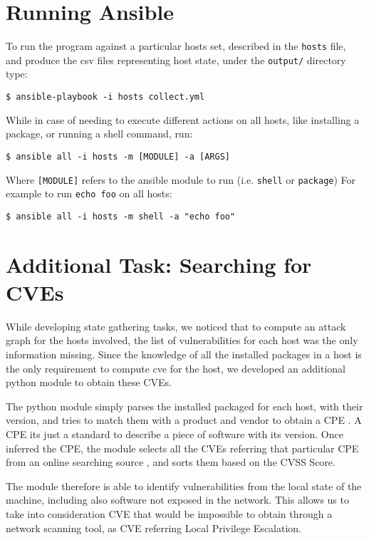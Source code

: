 \documentclass[11pt]{article}
\begin{document}
\section{Running Ansible}

To run the program against a particular hosts set, described in the {\tt hosts} file, and produce the csv files representing host state, under the {\tt output/} directory type:

\begin{verbatim}
$ ansible-playbook -i hosts collect.yml
\end{verbatim}

While in case of needing to execute different actions on all hosts, like installing a package, or running a shell command, run:

\begin{verbatim}
$ ansible all -i hosts -m [MODULE] -a [ARGS]
\end{verbatim}

Where {\tt [MODULE]} refers to the ansible module to run (i.e. {\tt shell} or {\tt package})
For example to run {\tt echo foo} on all hosts: 

\begin{verbatim}
$ ansible all -i hosts -m shell -a "echo foo"
\end{verbatim}

\section{Additional Task: Searching for CVEs}

While developing state gathering tasks, we noticed that to compute an attack graph for the hosts involved, the list of vulnerabilities for each host was the only information missing. Since the knowledge of all the installed packages in a host is the only requirement to compute cve for the host, we developed an additional python module to obtain these CVEs. 

\bigskip
The python module simply parses the installed packaged for each host, with their version, and tries to match them with a product and vendor to obtain a CPE \cite{cpe}. A CPE its just a standard to describe a piece of software with its version. 
Once inferred the CPE, the module selects all the CVEs referring that particular CPE from an online searching source \cite{cve-search}, and sorts them based on the CVSS Score.

The module therefore is able to identify vulnerabilities from the local state of the machine, including also software not exposed in the network. This allows us to take into consideration CVE that would be impossible to obtain through a network scanning tool, as CVE referring Local Privilege Escalation. 
\end{document}
